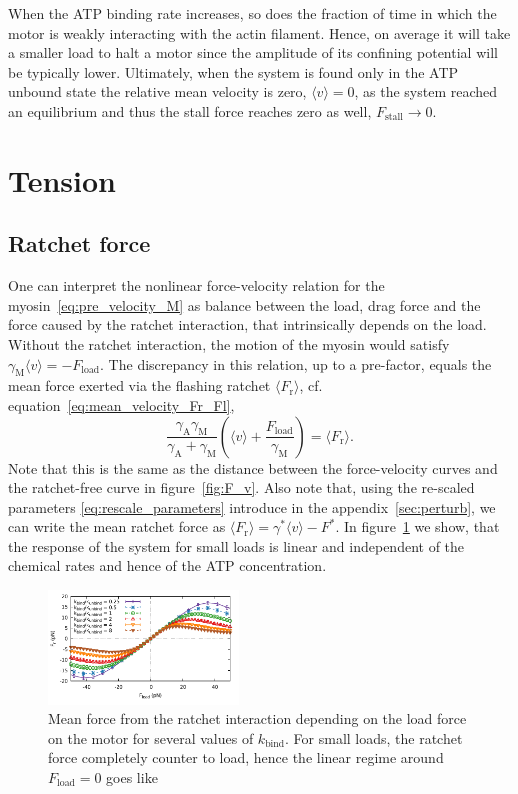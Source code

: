 \documentclass[aps,pre,twocolumn,showpacs,showkeys,superscriptaddress,floatfix]{revtex4-1}
\begin{document}
When the ATP binding rate increases, so does the fraction of time in which the motor is weakly interacting with the actin filament. 
Hence, on average it will take a smaller load to halt a motor since the amplitude of its confining potential will be typically lower.
Ultimately, when the system is found only in the ATP unbound state the relative mean velocity is zero, $\langle v \rangle = 0$, as the system reached an equilibrium 
and thus the stall force reaches zero as well, $F_\text{stall} \to 0$.


\section{Tension}

\subsection{Ratchet force} 
One can interpret the nonlinear force-velocity relation for the myosin~\eqref{eq:pre_velocity_M} as balance between the load, drag force and the force caused by the ratchet interaction, 
that intrinsically depends on the load. 
Without the ratchet interaction, the motion of the myosin would satisfy $ \gamma_\text{M}\langle v\rangle = -F_\text{load}$. 
The discrepancy in this relation, up to a pre-factor, equals the mean force exerted via the flashing ratchet $\langle F_\text{r}\rangle$, 
cf. equation~\eqref{eq:mean_velocity_Fr_Fl},
\begin{equation}
\frac{\gamma_\text{A}\gamma_\text{M}}{\gamma_\text{A} + \gamma_\text{M} } \left(\langle v \rangle + \frac{F_\text{load}}{\gamma_\text{M}}\right) = \langle F_\text{r} \rangle.
\label{eq:mean_ratchet_force}
\end{equation}
Note that this is the same as the distance between the force-velocity curves and the ratchet-free curve in figure~\ref{fig:F_v}. 
Also note that, using the re-scaled parameters \eqref{eq:rescale_parameters} introduce in the appendix~\ref{sec:perturb}, 
we can write the mean ratchet force as $\langle F_\text{r} \rangle = \gamma^* \langle v \rangle - F^*$.
In figure~\ref{fig:ratchet_force} we show, 
that the response of the system for small loads is linear and independent of the chemical rates and hence of the ATP concentration. 
\begin{figure}[t]
\centering
\includegraphics[width=0.45\textwidth,height=!]{ratchet_force}
\caption{
\label{fig:ratchet_force}
Mean force from the ratchet interaction depending on the load force on the motor for several values of $k_\text{bind}$. 
For small loads, the ratchet force completely counter to load, hence the linear regime around $F_\text{load}=0$ goes like
}
\end{figure}
\end{document}
